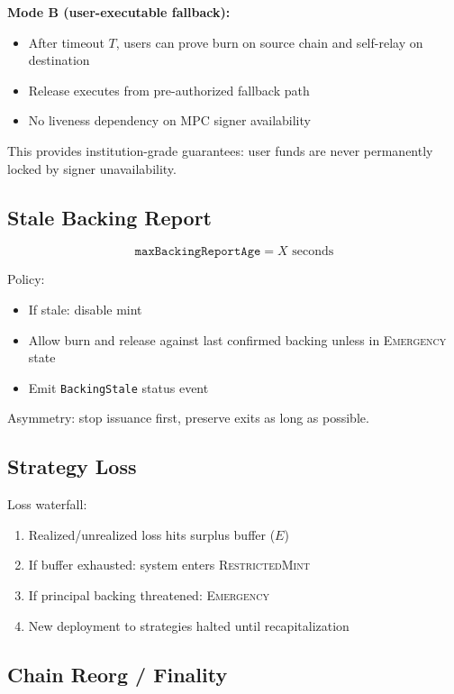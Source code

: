 \documentclass[11pt,a4paper]{article}
\begin{document}
\textbf{Mode B (user-executable fallback):}
\begin{itemize}[leftmargin=2em]
\item After timeout $T$, users can prove burn on source chain and self-relay on destination
\item Release executes from pre-authorized fallback path
\item No liveness dependency on MPC signer availability
\end{itemize}

This provides institution-grade guarantees: user funds are never permanently locked by signer unavailability.

\subsection{Stale Backing Report}

$$\texttt{maxBackingReportAge} = X \text{ seconds}$$

Policy:
\begin{itemize}[leftmargin=2em]
\item If stale: disable mint
\item Allow burn and release against last confirmed backing unless in \textsc{Emergency} state
\item Emit \texttt{BackingStale} status event
\end{itemize}

Asymmetry: stop issuance first, preserve exits as long as possible.

\subsection{Strategy Loss}

Loss waterfall:
\begin{enumerate}[leftmargin=2em]
\item Realized/unrealized loss hits surplus buffer ($E$)
\item If buffer exhausted: system enters \textsc{RestrictedMint}
\item If principal backing threatened: \textsc{Emergency}
\item New deployment to strategies halted until recapitalization
\end{enumerate}

\subsection{Chain Reorg / Finality}
\end{document}
